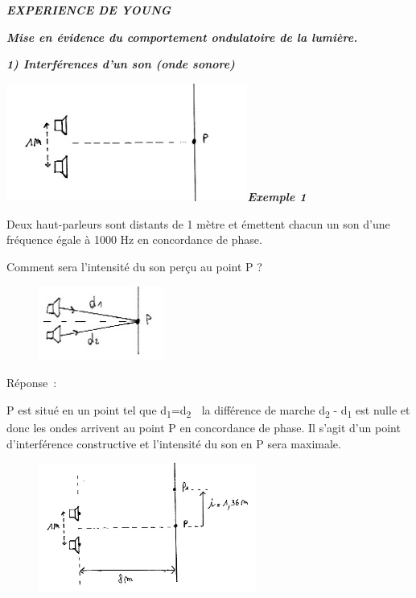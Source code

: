 \emph{\textbf{EXPERIENCE DE YOUNG}}

\emph{\textbf{Mise en évidence du comportement ondulatoire de la
lumière.}}

\emph{\textbf{1) Interférences d'un son (onde sonore)}}

\includegraphics[width=7.922cm,height=3.875cm]{Pictures/1000000100000156000000A71108C5553D5F186E.png}\emph{\textbf{Exemple
1}}

Deux haut-parleurs sont distants de 1 mètre et émettent chacun un son
d'une fréquence égale à 1000 Hz en concordance de phase.

Comment sera l'intensité du son perçu au point P ?

\begin{figure}
\centering
\includegraphics[width=4.12cm,height=2.434cm]{Pictures/100000010000009E0000005DF543EBD570977663.png}
\caption{}
\end{figure}

Réponse~:

P est situé en un point tel que d\textsubscript{1}=d\textsubscript{2} 
la différence de marche d\textsubscript{2} - d\textsubscript{1 }est
nulle et donc les ondes arrivent au point P en concordance de phase. Il
s'agit d'un point d'interférence constructive et l'intensité du son en P
sera maximale.

\begin{figure}
\centering
\includegraphics[width=7.154cm,height=4.233cm]{Pictures/1000000100000197000000F1DA056A96FDEF75DB.png}
\caption{}
\end{figure}


